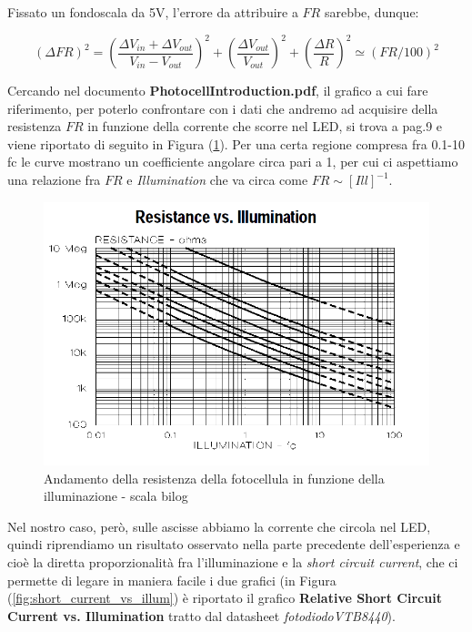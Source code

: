 \documentclass[journal, a4paper]{IEEEtran}
\begin{document}
Fissato un fondoscala da 5V, l'errore da attribuire a $FR$ sarebbe, dunque:

\begin{equation}
(\Delta FR)^2 = (\frac{\Delta V_{in} + \Delta V_{out}}{V_{in} - V_{out}})^2 + (\frac{\Delta V_{out}}{V_{out}})^2 + (\frac{\Delta R}{R})^2 \simeq (FR/100)^2
\end{equation}

Cercando nel documento \textbf{PhotocellIntroduction.pdf}, il grafico a cui fare riferimento, per poterlo confrontare con i dati che andremo ad acquisire della resistenza $FR$ in funzione della corrente che scorre nel LED, si trova a pag.9 e viene riportato di seguito in Figura (\ref{fig:res_versus_illumi}). Per una certa regione compresa fra 0.1-10 fc le curve mostrano un coefficiente angolare circa pari a 1, per cui ci aspettiamo una relazione fra $FR$ e \textit{Illumination} che va circa come $FR \sim [Ill]^{-1}$.\\

\begin{figure}
\centering
\includegraphics[width=0.9\linewidth]{./res_versus_illumi}
\caption{Andamento della resistenza della fotocellula in funzione della illuminazione - scala bilog}
\label{fig:res_versus_illumi}
\end{figure}

Nel nostro caso, però, sulle ascisse abbiamo la corrente che circola nel LED, quindi riprendiamo un risultato osservato nella parte precedente dell'esperienza e cioè la diretta proporzionalità fra l'illuminazione e la \textit{short circuit current}, che ci permette di legare in maniera facile i due grafici (in Figura (\ref{fig:short_current_vs_illum}) è riportato il grafico \textbf{Relative Short Circuit Current vs. Illumination} tratto dal datasheet \textit{fotodiodoVTB8440}).\\
\end{document}
